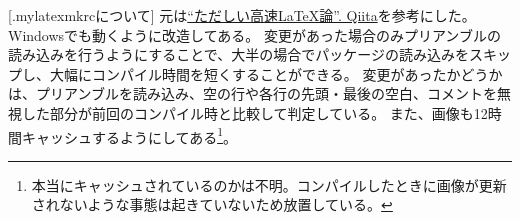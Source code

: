 \documentclass[uplatex, a4paper, dvipdfmx, 12pt]{jsreport}
\begin{document}
	[.mylatexmkrcについて]
		元は\href{https://qiita.com/JyJyJcr/items/69769c88eea9d0dae152}{``ただしい高速LaTeX論''. Qiita}を参考にした。
		Windowsでも動くように改造してある。
		変更があった場合のみプリアンブルの読み込みを行うようにすることで、大半の場合でパッケージの読み込みをスキップし、大幅にコンパイル時間を短くすることができる。
		変更があったかどうかは、プリアンブルを読み込み、空の行や各行の先頭・最後の空白、コメントを無視した部分が前回のコンパイル時と比較して判定している。
		また、画像も12時間キャッシュするようにしてある\footnote{本当にキャッシュされているのかは不明。コンパイルしたときに画像が更新されないような事態は起きていないため放置している。}。
\end{document}
